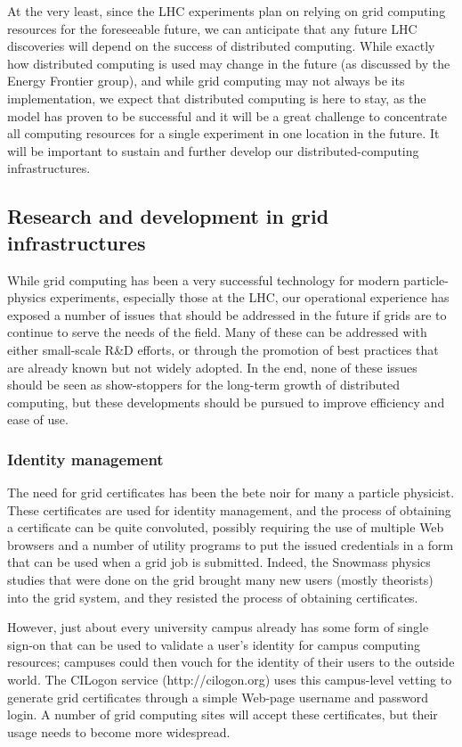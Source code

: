 At the very least, since the LHC experiments plan on relying on grid computing resources for the foreseeable future, we can anticipate that any future LHC discoveries will depend on the success of distributed computing.  While exactly how distributed computing is used may change in the future (as discussed by the Energy Frontier group), and while grid computing may not always be its implementation, we expect that distributed computing is here to stay, as the model has proven to be successful and it will be a great challenge to concentrate all computing resources for a single experiment in one location in the future.  It will be important to sustain and further develop our distributed-computing infrastructures.

\subsection{Research and development in grid infrastructures}

While grid computing has been a very successful technology for modern particle-physics experiments, especially those at the LHC, our operational experience has exposed a number of issues that should be addressed in the future if grids are to continue to serve the needs of the field.  Many of these can be addressed with either small-scale R\&D efforts, or through the promotion of best practices that are already known but not widely adopted.  In the end, none of these issues should be seen as show-stoppers for the long-term growth of distributed computing, but these developments should be pursued to improve efficiency and ease of use.

\subsubsection{Identity management}

The need for grid certificates has been the bete noir for many a particle physicist.  These certificates are used for identity management, and the process of obtaining a certificate can be quite convoluted, possibly requiring the use of multiple Web browsers and a number of utility programs to put the issued credentials in a form that can be used when a grid job is submitted.  Indeed, the Snowmass physics studies that were done on the grid brought many new users (mostly theorists) into the grid system, and they resisted the process of obtaining certificates.

However, just about every university campus already has some form of single sign-on that can be used to validate a user's identity for campus computing resources; campuses could then vouch for the identity of their users to the outside world.  The CILogon service (http://cilogon.org) uses this campus-level vetting to generate grid certificates through a simple Web-page username and password login.  A number of grid computing sites will accept these certificates, but their usage needs to become more widespread.

